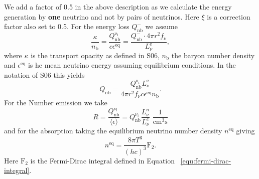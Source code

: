 \documentclass[fleqn,usenatbib]{mnras}
\begin{document}
\begin{appendices}
We add a factor of 0.5 in the above description as we calculate the energy generation by \textbf{one} neutrino and not by pairs of neutrinos. Here $\xi$ is a correction factor also set to 0.5.
For the energy loss $Q_{\mathrm{nb}}^{-}$ we assume
\begin{equation}
    \frac{\kappa}{n_{\mathrm{b}}} = \frac{Q_{\mathrm{nb}}^{\mathrm{\nu_i}}}{c \epsilon^{\mathrm{eq}}} = \frac{Q_{\mathrm{nb}}^{-}\cdot 4\pi r^2 f_{\nu}}{L_{\nu}^{\mathrm{e}}}, 
\end{equation}
where $\kappa$ is the transport opacity as defined in S06, $n_{\text{b}}$ the baryon number density and $\epsilon^{\mathrm{eq}}$ is he mean neutrino energy assuming equilibrium conditions.
In the notation of S06 this yields
\begin{equation}
    Q_{\mathrm{nb}}^{-} = \frac{Q_{\mathrm{nb}}^{\mathrm{\nu_i}} L_{\nu}^{\mathrm{e}} }{4\pi r^2 f_{\nu} c \epsilon^{\mathrm{eq}} n_{\mathrm{b}}}.
\end{equation}
For the Number emission we take
\begin{equation}
    R=\frac{Q_{\mathrm{nb}}^{\nu_{\mathrm{i}}}}{\langle \epsilon \rangle} = Q_{\mathrm{nb}}^{\nu_i} \frac{L_{\nu}^n }{L_{\nu}^e }\,\, \mathrm{\frac{1}{cm^3s}}
\end{equation}
and for the absorption taking the equilibrium neutrino number density $n^{\mathrm{eq}}$ giving
\begin{equation}
    n^{\mathrm{eq}} = \frac{8\pi T^3}{(hc)^3}\mathrm{F}_2.
\end{equation}
Here $\mathrm{F}_2$ is the Fermi-Dirac integral defined in Equation ~\ref{equ:fermi-dirac-integral}.

\end{appendices}
\newpage

\bsp	%
\label{lastpage}
\end{document}
